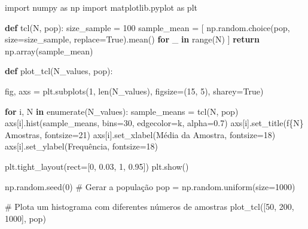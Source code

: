 \documentclass[
  letterpaper,
  DIV=11,
  numbers=noendperiod]{scrreprt}
\newenvironment{Shaded}{\begin{snugshade}}{\end{snugshade}}
\newcommand{\BuiltInTok}[1]{\textcolor[rgb]{0.00,0.23,0.31}{#1}}
\newcommand{\CommentTok}[1]{\textcolor[rgb]{0.37,0.37,0.37}{#1}}
\newcommand{\ControlFlowTok}[1]{\textcolor[rgb]{0.00,0.23,0.31}{\textbf{#1}}}
\newcommand{\DecValTok}[1]{\textcolor[rgb]{0.68,0.00,0.00}{#1}}
\newcommand{\FloatTok}[1]{\textcolor[rgb]{0.68,0.00,0.00}{#1}}
\newcommand{\ImportTok}[1]{\textcolor[rgb]{0.00,0.46,0.62}{#1}}
\newcommand{\KeywordTok}[1]{\textcolor[rgb]{0.00,0.23,0.31}{\textbf{#1}}}
\newcommand{\NormalTok}[1]{\textcolor[rgb]{0.00,0.23,0.31}{#1}}
\newcommand{\OperatorTok}[1]{\textcolor[rgb]{0.37,0.37,0.37}{#1}}
\newcommand{\SpecialCharTok}[1]{\textcolor[rgb]{0.37,0.37,0.37}{#1}}
\newcommand{\SpecialStringTok}[1]{\textcolor[rgb]{0.13,0.47,0.30}{#1}}
\newcommand{\StringTok}[1]{\textcolor[rgb]{0.13,0.47,0.30}{#1}}
\newcommand{\VariableTok}[1]{\textcolor[rgb]{0.07,0.07,0.07}{#1}}
\theoremstyle{definition}
\theoremstyle{plain}
\theoremstyle{remark}
\begin{document}
\begin{Shaded}
\begin{Highlighting}[]
\ImportTok{import}\NormalTok{ numpy }\ImportTok{as}\NormalTok{ np}
\ImportTok{import}\NormalTok{ matplotlib.pyplot }\ImportTok{as}\NormalTok{ plt}

\KeywordTok{def}\NormalTok{ tcl(N, pop):}
\NormalTok{    size\_sample }\OperatorTok{=} \DecValTok{100}
\NormalTok{    sample\_mean }\OperatorTok{=}\NormalTok{ [}
\NormalTok{        np.random.choice(pop, size}\OperatorTok{=}\NormalTok{size\_sample, replace}\OperatorTok{=}\VariableTok{True}\NormalTok{).mean() }\ControlFlowTok{for}\NormalTok{ \_ }\KeywordTok{in} \BuiltInTok{range}\NormalTok{(N)}
\NormalTok{    ]}
    \ControlFlowTok{return}\NormalTok{ np.array(sample\_mean)}

\KeywordTok{def}\NormalTok{ plot\_tcl(N\_values, pop):}

\NormalTok{    fig, axs }\OperatorTok{=}\NormalTok{ plt.subplots(}\DecValTok{1}\NormalTok{, }\BuiltInTok{len}\NormalTok{(N\_values), figsize}\OperatorTok{=}\NormalTok{(}\DecValTok{15}\NormalTok{, }\DecValTok{5}\NormalTok{), sharey}\OperatorTok{=}\VariableTok{True}\NormalTok{)}
    
    \ControlFlowTok{for}\NormalTok{ i, N }\KeywordTok{in} \BuiltInTok{enumerate}\NormalTok{(N\_values):}
\NormalTok{        sample\_means }\OperatorTok{=}\NormalTok{ tcl(N, pop)}
\NormalTok{        axs[i].hist(sample\_means, bins}\OperatorTok{=}\DecValTok{30}\NormalTok{, edgecolor}\OperatorTok{=}\StringTok{\textquotesingle{}k\textquotesingle{}}\NormalTok{, alpha}\OperatorTok{=}\FloatTok{0.7}\NormalTok{)}
\NormalTok{        axs[i].set\_title(}\SpecialStringTok{f\textquotesingle{}}\SpecialCharTok{\{}\NormalTok{N}\SpecialCharTok{\}}\SpecialStringTok{ Amostras\textquotesingle{}}\NormalTok{, fontsize}\OperatorTok{=}\DecValTok{21}\NormalTok{)}
\NormalTok{        axs[i].set\_xlabel(}\StringTok{\textquotesingle{}Média da Amostra\textquotesingle{}}\NormalTok{, fontsize}\OperatorTok{=}\DecValTok{18}\NormalTok{)}
\NormalTok{        axs[i].set\_ylabel(}\StringTok{\textquotesingle{}Frequência\textquotesingle{}}\NormalTok{, fontsize}\OperatorTok{=}\DecValTok{18}\NormalTok{)}

\NormalTok{    plt.tight\_layout(rect}\OperatorTok{=}\NormalTok{[}\DecValTok{0}\NormalTok{, }\FloatTok{0.03}\NormalTok{, }\DecValTok{1}\NormalTok{, }\FloatTok{0.95}\NormalTok{])}
\NormalTok{    plt.show()}

\NormalTok{np.random.seed(}\DecValTok{0}\NormalTok{)}
\CommentTok{\# Gerar a população}
\NormalTok{pop }\OperatorTok{=}\NormalTok{ np.random.uniform(size}\OperatorTok{=}\DecValTok{1000}\NormalTok{)}

\CommentTok{\# Plota um histograma com diferentes números de amostras}
\NormalTok{plot\_tcl([}\DecValTok{50}\NormalTok{, }\DecValTok{200}\NormalTok{, }\DecValTok{1000}\NormalTok{], pop)}
\end{Highlighting}
\end{Shaded}
\end{document}
